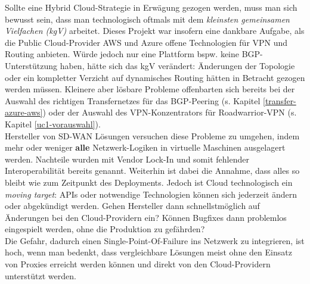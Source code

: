 Sollte eine Hybrid Cloud-Strategie in Erwägung gezogen werden, muss man sich bewusst sein, dass man technologisch oftmals mit dem \textit{kleinsten gemeinsamen Vielfachen (kgV)} arbeitet. Dieses Projekt war insofern eine dankbare Aufgabe, als die Public Cloud-Provider AWS und Azure offene Technologien für VPN und Routing anbieten. Würde jedoch nur eine Plattform bspw. keine BGP-Unterstützung haben, hätte sich das kgV verändert: Änderungen der Topologie oder ein kompletter Verzicht auf dynamisches Routing hätten in Betracht gezogen werden müssen. Kleinere aber lösbare Probleme offenbarten sich bereits bei der Auswahl des richtigen Transfernetzes für das BGP-Peering (s. Kapitel \ref{transfer-azure-aws}) oder der Auswahl des VPN-Konzentrators für Roadwarrior-VPN (s. Kapitel \ref{uc1-vorauswahl}).\\
Hersteller von SD-WAN Lösungen versuchen diese Probleme zu umgehen, indem mehr oder weniger \textbf{alle} Netzwerk-Logiken in virtuelle Maschinen ausgelagert werden. Nachteile wurden mit Vendor Lock-In und somit fehlender Interoperabilität bereits genannt. Weiterhin ist dabei die Annahme, dass alles so bleibt wie zum Zeitpunkt des \gls{Deployment}s. Jedoch ist Cloud technologisch ein \textit{moving target}: APIs oder notwendige Technologien können sich jederzeit ändern oder abgekündigt werden\cite{Yegge2020}. Gehen Hersteller dann schnellstmöglich auf Änderungen bei den Cloud-Providern ein? Können Bugfixes dann problemlos eingespielt werden, ohne die Produktion zu gefährden?\\ 
Die Gefahr, dadurch einen Single-Point-Of-Failure ins Netzwerk zu integrieren, ist hoch, wenn man bedenkt, dass vergleichbare Lösungen meist ohne den Einsatz von \glqq Proxies\grqq{} erreicht werden können und direkt von den Cloud-Providern unterstützt werden.


%



%
%

